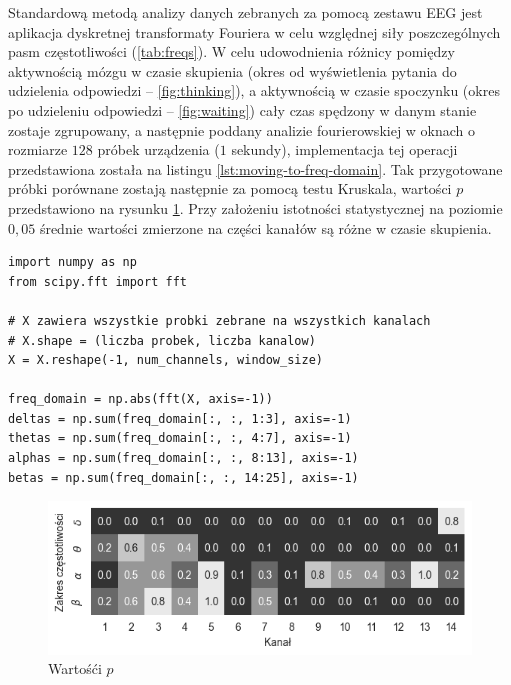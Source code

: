 \documentclass{./assets/wfis}
\begin{document}
Standardową metodą analizy danych zebranych za pomocą zestawu EEG jest aplikacja dyskretnej transformaty Fouriera w celu względnej siły poszczególnych pasm częstotliwości (\autoref{tab:freqs}). W celu udowodnienia różnicy pomiędzy aktywnością mózgu w czasie skupienia (okres od wyświetlenia pytania do udzielenia odpowiedzi – \autoref{fig:thinking}), a aktywnością w czasie spoczynku (okres po udzieleniu odpowiedzi – \autoref{fig:waiting}) cały czas spędzony w danym stanie zostaje zgrupowany, a następnie poddany analizie fourierowskiej w oknach o rozmiarze $128$ próbek urządzenia ($1$ sekundy), implementacja tej operacji przedstawiona została na listingu \ref{lst:moving-to-freq-domain}. Tak przygotowane próbki porównane zostają następnie za pomocą testu Kruskala, wartości $p$ przedstawiono na rysunku \ref{fig:thinking-vs-waiting-pvalue}. Przy założeniu istotności statystycznej na poziomie $0,05$ średnie wartości zmierzone na części kanałów są różne w czasie skupienia.


\begin{lstlisting}[caption={Przejście do domeny częstotliwościowej},label={lst:moving-to-freq-domain}]
import numpy as np
from scipy.fft import fft

# X zawiera wszystkie probki zebrane na wszystkich kanalach
# X.shape = (liczba probek, liczba kanalow)
X = X.reshape(-1, num_channels, window_size)

freq_domain = np.abs(fft(X, axis=-1))
deltas = np.sum(freq_domain[:, :, 1:3], axis=-1)
thetas = np.sum(freq_domain[:, :, 4:7], axis=-1)
alphas = np.sum(freq_domain[:, :, 8:13], axis=-1)
betas = np.sum(freq_domain[:, :, 14:25], axis=-1)
\end{lstlisting}

\begin{figure}[h!]
    \centering
    \includegraphics[width=0.75\columnwidth]{thesis/assets/thinking_vs_waiting_pvalue.png}
    \caption{Wartośći $p$}
    \label{fig:thinking-vs-waiting-pvalue}
\end{figure}
\end{document}

